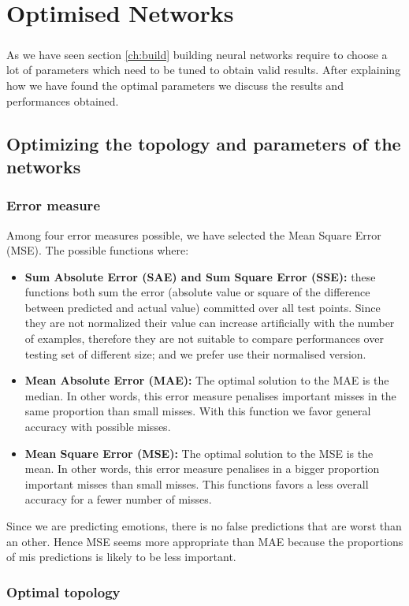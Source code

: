 \documentclass[a4paper,12pt,oneside,final]{report}
\begin{document}
\chapter{Optimised Networks}
\paragraph{}
As we have seen section \ref{ch:build} building neural networks require to choose a lot of parameters which need to be tuned to obtain valid results. After explaining how we have found the optimal parameters we discuss the results and performances obtained.
\section{Optimizing the topology and parameters of the networks}
\subsection{Error measure}
Among four error measures possible, we have selected the Mean Square Error (MSE). The possible functions where:
\begin{itemize}
\item { \bf Sum Absolute Error (SAE) and Sum Square Error (SSE):} these functions both sum the error (absolute value or square of the difference between predicted and actual value) committed over all test points. Since they are not normalized their value can increase artificially with the number of examples, therefore they are not suitable to compare performances over testing set of different size; and we prefer use their normalised version.
\item { \bf Mean Absolute Error (MAE):} The optimal solution to the MAE is the median. In other words, this error measure penalises important misses in the same proportion than small misses. With this function we favor general accuracy with possible misses.
\item { \bf Mean Square Error (MSE):} The optimal solution to the MSE is the mean. In other words, this error measure penalises in a bigger proportion important misses than small misses. This functions favors a less overall accuracy for a fewer number of misses.
\end{itemize}
Since we are predicting emotions, there is no false predictions that are worst than an other. Hence MSE seems more appropriate than MAE because the proportions of mis predictions is likely to be less important.
\subsection{Optimal topology}
\end{document}
